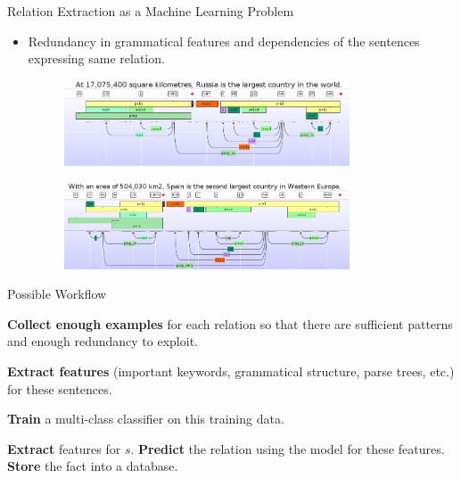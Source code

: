\documentclass{beamer}
\begin{document}
\begin{frame}{Relation Extraction as a Machine Learning Problem}
 
 \begin{itemize}
  \item Redundancy in grammatical features and dependencies of the sentences expressing same relation. \pause 
     \begin{figure}
    \centering
    \includegraphics[width = 0.8\textwidth]{images/ex_4}
  \end{figure} \pause
  
   \begin{figure}
    \centering
    \includegraphics[width = 0.8\textwidth]{images/ex_5}
  \end{figure}
 \end{itemize}

\end{frame}


\begin{frame}{Possible Workflow} \pause

\begin{algorithmic}[1]
\State \textbf{Collect enough examples} for each relation so that there are sufficient patterns and enough redundancy to exploit.
\item[]
\State \textbf{Extract features} (important keywords, grammatical structure, parse trees, etc.) for these sentences.
\item[]
\State \textbf{Train} a multi-class classifier on this training data.
\item[]
\State \textbf{Extract} features for $s$.
\State \textbf{Predict} the relation using the model for these features.
\State \textbf{Store} the fact into a database.
\EndFor
\end{algorithmic}
\end{frame}
\end{document}
